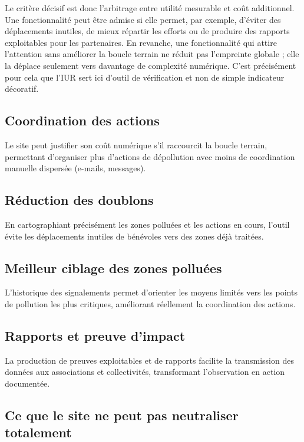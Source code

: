 \documentclass[
  10pt,
  a4paper,
  DIV=11,
  numbers=noendperiod,
  oneside]{scrreprt}
\begin{document}
Le critère décisif est donc l'arbitrage entre utilité mesurable et coût
additionnel. Une fonctionnalité peut être admise si elle permet, par
exemple, d'éviter des déplacements inutiles, de mieux répartir les
efforts ou de produire des rapports exploitables pour les partenaires.
En revanche, une fonctionnalité qui attire l'attention sans améliorer la
boucle terrain ne réduit pas l'empreinte globale ; elle la déplace
seulement vers davantage de complexité numérique. C'est précisément pour
cela que l'IUR sert ici d'outil de vérification et non de simple
indicateur décoratif.

\subsection{Coordination des actions}\label{coordination-des-actions}

Le site peut justifier son coût numérique s'il raccourcit la boucle
terrain, permettant d'organiser plus d'actions de dépollution avec moins
de coordination manuelle dispersée (e-mails, messages).

\subsection{Réduction des doublons}\label{ruxe9duction-des-doublons}

En cartographiant précisément les zones polluées et les actions en
cours, l'outil évite les déplacements inutiles de bénévoles vers des
zones déjà traitées.

\subsection{Meilleur ciblage des zones
polluées}\label{meilleur-ciblage-des-zones-polluuxe9es}

L'historique des signalements permet d'orienter les moyens limités vers
les points de pollution les plus critiques, améliorant réellement la
coordination des actions.

\subsection{Rapports et preuve
d'impact}\label{rapports-et-preuve-dimpact}

La production de preuves exploitables et de rapports facilite la
transmission des données aux associations et collectivités, transformant
l'observation en action documentée.

\subsection{Ce que le site ne peut pas neutraliser
totalement}\label{ce-que-le-site-ne-peut-pas-neutraliser-totalement}
\end{document}
